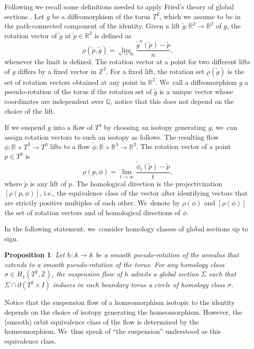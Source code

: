 \documentclass[11pt]{article}
\newcommand{\ie}{i.e.,\xspace}
\newtheorem{prop}[theorem]{Proposition}
\theoremstyle{definition}
\begin{document}
Following \cite{K1} we recall some definitions needed to apply Fried's theory of global sections \cite{Fr}. Let $g$ be a diffeomorphism of the torus $T^2$, which we assume to be in the path-connected component of the identity. Given a lift $\widetilde g:\mathbb{R}^2 \rightarrow \mathbb{R}^2$ of $g$, the rotation vector of $\widetilde g$ at $\widetilde p \in \mathbb{R}^2$ is defined as
\[
\rho(\widetilde p, \widetilde g)=\lim_{n\rightarrow \infty} \frac{\widetilde g^n(\widetilde p)-\widetilde p}{n},
\]
whenever the limit is defined. The rotation vector at a point for two different lifts of $g$ differs by a fixed vector in $\mathbb{Z}^2$. For a fixed lift, the rotation set $\rho(\widetilde g)$ is the set of rotation vectors obtained at any point in $\mathbb{R}^2$. We~call a diffeomorphism $g$ a pseudo-rotation of the torus if the rotation set of $\widetilde g$ is a unique vector whose coordinates are independent over $\mathbb{Q}$, notice that this does not depend on the choice of the lift.

If we suspend $g$ into a flow of $T^3$ by choosing an isotopy generating $g$, we~can assign rotation vectors to such an isotopy as follows. The resulting flow $\phi: \mathbb{R}\times T^3\rightarrow T^3$ lifts to a flow $\widetilde \phi: \mathbb{R}\times \mathbb{R}^3\rightarrow \mathbb{R}^3$. The rotation vector of a point $p\in T^3$ is
\[
\rho(p,\phi)=\lim_{t\rightarrow \infty}\frac{\widetilde \phi_t(\widetilde p)-\widetilde p}{t},
\]
where $\widetilde p$ is any lift of $p$. The homological direction is the projectivization $[\rho(p,\phi)]$, \ie the equivalence class of the vector after identifying vectors that are strictly positive multiples of each other. We~denote by $\rho(\phi)$ and $[\rho(\phi)]$ the set of rotation vectors and of homological directions of $\phi$.

In the following statement, we~consider homology classes of global sections up to sign.
\begin{prop}\label{prop:sections}
Let $h: \mathbb{A} \rightarrow \mathbb{A}$ be a smooth pseudo-rotation of the annulus that extends to a smooth pseudo-rotation of the torus. For any homology class $\sigma\in H_1(T^2,\mathbb{Z})$, the suspension flow of $h$ admits a global section $\Sigma$ such that $ \Sigma \cap \partial (T^2\times I)$ induces in each boundary torus a circle of homology class $\sigma$.
\end{prop}

Notice that the suspension flow of a homeomorphism isotopic to the identity depends on the choice of isotopy generating the homeomorphism. However, the (smooth) orbit equivalence class of the flow is determined by the homeomorphism. We~thus speak of ``the suspension'' understood as this equivalence class.
\end{document}

